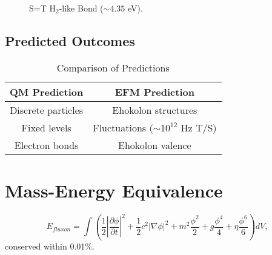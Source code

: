 \documentclass{article}
\begin{document}
\begin{figure}[ht]
    \centering
    \caption{S=T H$_2$-like Bond ($\sim 4.35$ eV).}
    \label{fig:molecular}
\end{figure}

\subsection{Predicted Outcomes}
\begin{table}[h]
    \centering
    \begin{tabular}{|c|c|}
        \hline
        \textbf{QM Prediction} & \textbf{EFM Prediction} \\
        \hline
        Discrete particles & Ehokolon structures \\
        Fixed levels & Fluctuations ($\sim 10^{12}$ Hz T/S) \\
        Electron bonds & Ehokolon valence \\
        \hline
    \end{tabular}
    \caption{Comparison of Predictions}
    \label{tab:predictions}
\end{table}

\section{Mass-Energy Equivalence}
\begin{equation}
E_{fluxon} = \int \left( \frac{1}{2} \left|\frac{\partial \phi}{\partial t}\right|^2 + \frac{1}{2} c^2 |\nabla \phi|^2 + m^2 \frac{\phi^2}{2} + g \frac{\phi^4}{4} + \eta \frac{\phi^6}{6} \right) dV,
\end{equation}
conserved within 0.01\%.
\end{document}
